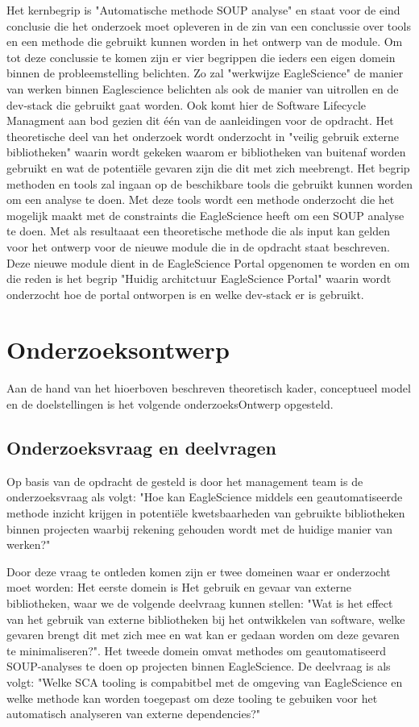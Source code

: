 Het kernbegrip is "Automatische methode SOUP analyse" en staat voor de eind conclusie die het onderzoek moet opleveren in de zin van een conclussie over tools en een methode die gebruikt kunnen worden in het ontwerp van de module. Om tot deze conclussie te komen zijn er vier begrippen die ieders een eigen domein binnen de probleemstelling belichten. Zo zal "werkwijze EagleScience" de manier van werken binnen Eaglescience belichten als ook de manier van uitrollen en de dev-stack die gebruikt gaat worden. Ook komt hier de Software Lifecycle Managment aan bod gezien dit één van de aanleidingen voor de opdracht. Het theoretische deel van het onderzoek wordt onderzocht in "veilig gebruik externe bibliotheken" waarin wordt gekeken waarom er bibliotheken van buitenaf worden gebruikt en wat de potentiële gevaren zijn die dit met zich meebrengt. Het begrip methoden en tools zal ingaan op de beschikbare tools die gebruikt kunnen worden om een analyse te doen. Met deze tools wordt een methode onderzocht die het mogelijk maakt met de constraints die EagleScience heeft om een SOUP analyse te doen. Met als resultaaat een theoretische methode die als input kan gelden voor het ontwerp voor de nieuwe module die in de opdracht staat beschreven. Deze nieuwe module dient in de EagleScience Portal opgenomen te worden en om die reden is het begrip "Huidig architctuur EagleScience Portal" waarin wordt onderzocht hoe de portal ontworpen is en welke dev-stack er is gebruikt.

\section{Onderzoeksontwerp}\label{sec:OP_onderzoeksontwerp}
Aan de hand van het hioerboven beschreven theoretisch kader, conceptueel model en de doelstellingen is het volgende onderzoeksOntwerp opgesteld.

\subsection{Onderzoeksvraag en deelvragen}\label{subsec:onderzoeksvraag-en-deelvragen}
Op basis van de opdracht de gesteld is door het management team is de onderzoeksvraag als volgt: "Hoe kan EagleScience middels een geautomatiseerde methode inzicht krijgen in potentiële kwetsbaarheden van gebruikte bibliotheken binnen projecten waarbij rekening gehouden wordt met de huidige manier van werken?"

Door deze vraag te ontleden komen zijn er twee domeinen waar er onderzocht moet worden:
Het eerste domein is Het gebruik en gevaar van externe bibliotheken, waar we de volgende deelvraag kunnen stellen: "Wat is het effect van het gebruik van externe bibliotheken bij het ontwikkelen van software, welke gevaren brengt dit met zich mee en wat kan er gedaan worden om deze gevaren te minimaliseren?". Het tweede domein omvat methodes om geautomatiseerd SOUP-analyses te doen op projecten binnen EagleScience. De deelvraag is als volgt: "Welke SCA tooling is compabitbel met de omgeving van EagleScience en welke methode kan worden toegepast om deze tooling te gebuiken voor het automatisch analyseren van externe dependencies?"

